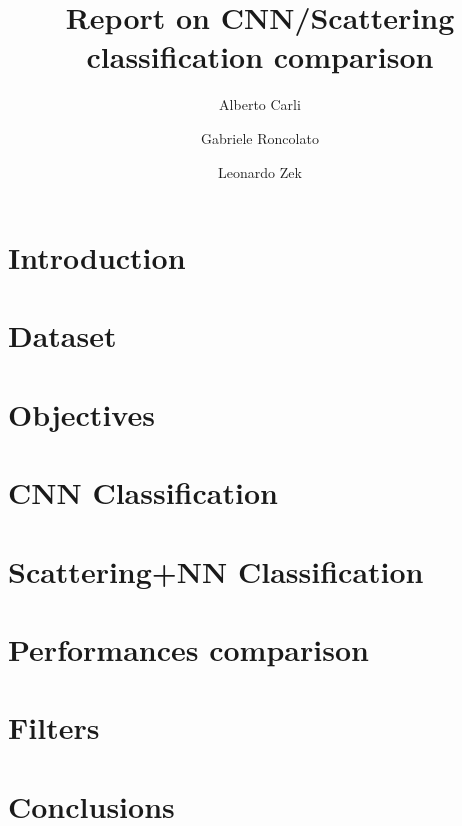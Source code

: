 \documentclass{report}
\title{Report on CNN/Scattering classification comparison}
\author{Alberto Carli \and Gabriele Roncolato \and Leonardo Zek}
\date{}
\begin{document}
\maketitle
\tableofcontents
\pagebreak

\chapter{Introduction}
\chapter{Dataset}
\chapter{Objectives}
\chapter{CNN Classification}
\chapter{Scattering+NN Classification}
\chapter{Performances comparison}
\chapter{Filters}
\chapter{Conclusions}
\end{document}
